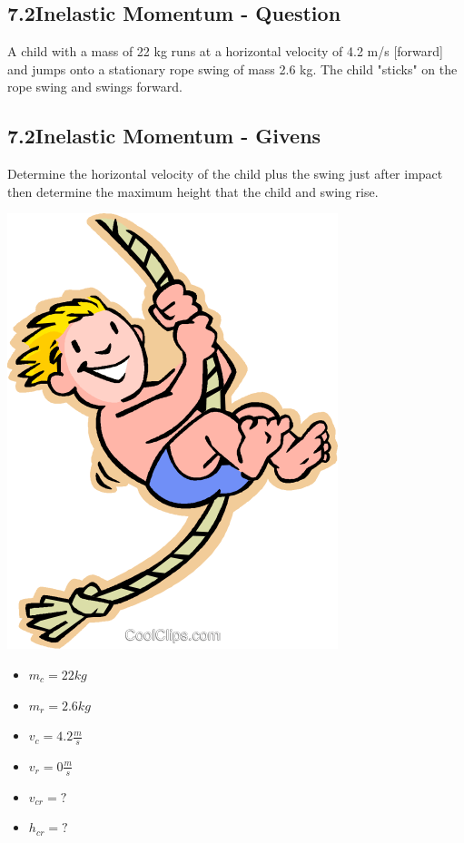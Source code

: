 \subsection*{7.2\hspace*{0.5cm}Inelastic Momentum - Question}
A child with a mass of 22 kg runs at a horizontal velocity of 4.2 m/s [forward] and jumps onto a stationary rope swing of mass 2.6 kg. The child "sticks" on the rope swing and swings forward.
\subsection*{7.2\hspace*{0.5cm}Inelastic Momentum - Givens}
Determine the horizontal velocity of the child plus the swing just after impact then determine the maximum height that the child and swing rise.\newline\newline
\begin{minipage}{0.5\textwidth}
    \includegraphics[scale=0.33]{./images/child_rope}
\end{minipage}
\begin{minipage}{0.5\textwidth}
    \begin{itemize}
        \item $m_{c} = 22kg$
        \item $m_{r} = 2.6kg$
        \item $v_{c} = 4.2\frac{m}{s}$
        \item $v_{r} = 0\frac{m}{s}$
        \item $v_{cr} = ?$
        \item $h_{cr} = ?$
    \end{itemize}
\end{minipage}
